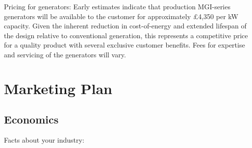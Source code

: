 \documentclass[a4paper,11pt]{article}
\begin{document}
Pricing for generators: Early estimates indicate that production MGI-series generators will be available to the customer for approximately £4,350 per kW capacity. Given the inherent reduction in cost-of-energy and extended lifespan of the design relative to conventional generation, this represents a competitive price for a quality product with several exclusive customer benefits. Fees for expertise and servicing of the generators will vary.
\pagebreak

\section{Marketing Plan}
\subsection{Economics}
Facts about your industry:
\end{document}
